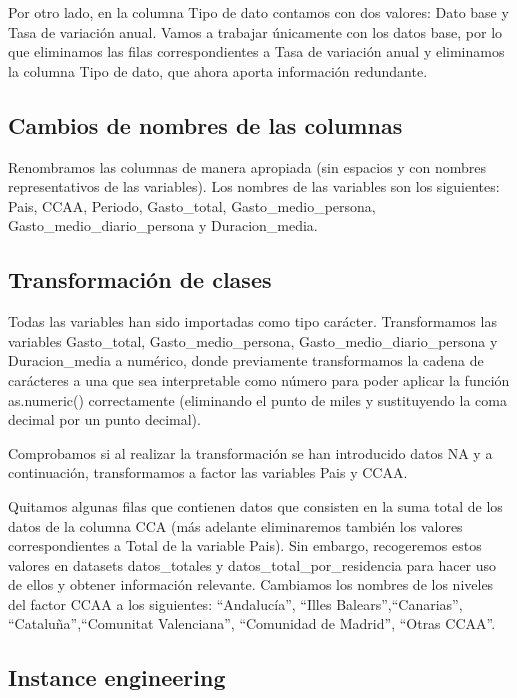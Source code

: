 \documentclass[data,article,submit,moreauthors,pdftex]{Definitions/mdpi}
\begin{document}
Por otro lado, en la columna Tipo de dato contamos con dos valores: Dato
base y Tasa de variación anual. Vamos a trabajar únicamente con los
datos base, por lo que eliminamos las filas correspondientes a Tasa de
variación anual y eliminamos la columna Tipo de dato, que ahora aporta
información redundante.

\subsection{Cambios de nombres de las
columnas}\label{cambios-de-nombres-de-las-columnas}

Renombramos las columnas de manera apropiada (sin espacios y con nombres
representativos de las variables). Los nombres de las variables son los
siguientes: Pais, CCAA, Periodo, Gasto\_total, Gasto\_medio\_persona,
Gasto\_medio\_diario\_persona y Duracion\_media.

\subsection{Transformación de clases}\label{transformaciuxf3n-de-clases}

Todas las variables han sido importadas como tipo carácter.
Transformamos las variables Gasto\_total, Gasto\_medio\_persona,
Gasto\_medio\_diario\_persona y Duracion\_media a numérico, donde
previamente transformamos la cadena de carácteres a una que sea
interpretable como número para poder aplicar la función as.numeric()
correctamente (eliminando el punto de miles y sustituyendo la coma
decimal por un punto decimal).

Comprobamos si al realizar la transformación se han introducido datos NA
y a continuación, transformamos a factor las variables Pais y CCAA.

Quitamos algunas filas que contienen datos que consisten en la suma
total de los datos de la columna CCA (más adelante eliminaremos también
los valores correspondientes a Total de la variable Pais). Sin embargo,
recogeremos estos valores en datasets datos\_totales y
datos\_total\_por\_residencia para hacer uso de ellos y obtener
información relevante. Cambiamos los nombres de los niveles del factor
CCAA a los siguientes: ``Andalucía'', ``Illes Balears'',``Canarias'',
``Cataluña'',``Comunitat Valenciana'', ``Comunidad de Madrid'', ``Otras
CCAA''.

\subsection{Instance engineering}\label{instance-engineering}
\end{document}
